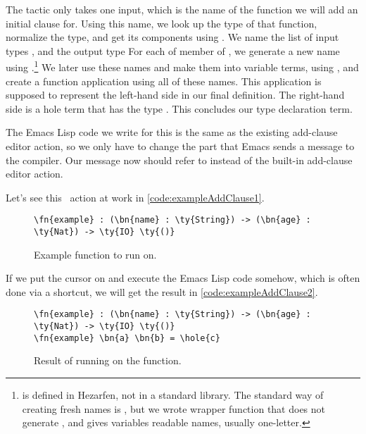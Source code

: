 The  tactic only takes one input, which is the name of the function
we will add an initial clause for.
Using this name, we look up the type of that function,
normalize the type, and get its components
using .
We name the list of input types , and the output type 
For each of member of , we generate a new name using
.\footnote{ is defined in Hezarfen, not in a standard
library. The standard way of creating fresh names is , but we wrote
wrapper function  that does not generate , and gives variables
readable names, usually one-letter.} We later use these names and make them
into variable terms, using , and create a function application using
all of these names. This application is supposed to represent the left-hand
side in our final definition. The right-hand side is a hole term that has the
type .  This concludes our type declaration term.

The Emacs Lisp code we write for this is the same as the existing add-clause
editor action, so we only have to change the part that Emacs sends a message to
the compiler. Our message now should refer to  instead of the
built-in add-clause editor action.

Let's see this \Elab\ action at work in \autoref{code:exampleAddClause1}.

\begin{figure}[ht]
\caption{Example function to run  on.}
\label{code:exampleAddClause1}
\begin{Verbatim}[framesep=2mm, label=\footnotesize{\normalfont{Idris}}, labelposition=topline]
\fn{example} : (\bn{name} : \ty{String}) -> (\bn{age} : \ty{Nat}) -> \ty{IO} \ty{()}
\end{Verbatim}
\end{figure}

If we put the cursor on  and execute the Emacs Lisp code somehow, which is often done via a shortcut, we will get the result in \autoref{code:exampleAddClause2}.

\begin{figure}[ht]
\caption{Result of running  on the  function.}
\label{code:exampleAddClause2}
\begin{Verbatim}[framesep=2mm, label=\footnotesize{\normalfont{Idris}}, labelposition=topline]
\fn{example} : (\bn{name} : \ty{String}) -> (\bn{age} : \ty{Nat}) -> \ty{IO} \ty{()}
\fn{example} \bn{a} \bn{b} = \hole{c}
\end{Verbatim}
\end{figure}


